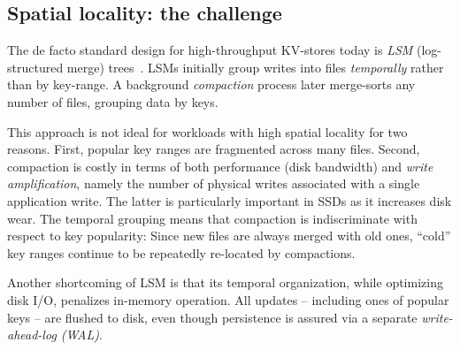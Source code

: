 \subsection{Spatial locality: the challenge}  
\label{ssec:B-tree-compare}



The de facto standard design for high-throughput KV-stores today is \emph{LSM} (log-structured merge) trees~\cite{DBLP:journals/acta/ONeilCGO96}. 
LSMs initially group writes  into files \emph{temporally} rather than by key-range. 
A background \emph{compaction} process later merge-sorts any number of files, grouping data by keys. 

This approach is not ideal for workloads with high spatial locality for two reasons. 
First,  popular key ranges are fragmented across many files. 
Second,  compaction  is costly in terms of  both performance 
(disk bandwidth) and \emph{write amplification}, namely the number of physical writes 
associated with a single application write. The latter is  particularly important in SSDs as it increases disk wear. 
The temporal grouping means that compaction is indiscriminate with respect to key popularity:  
Since new  files are always merged with old ones, 
 ``cold'' key ranges  continue to be repeatedly re-located by  compactions.  

Another shortcoming of LSM is that its temporal organization, while optimizing disk I/O,  penalizes in-memory operation. 
All updates -- including ones of popular keys -- are flushed to disk, even though persistence is assured via a separate \emph{write-ahead-log (WAL)}.

